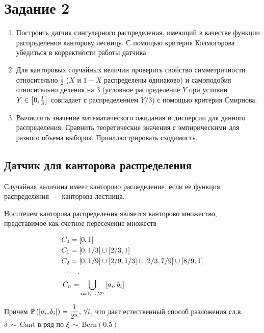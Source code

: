 \section{Задание 2}
    \begin{enumerate}
        \item Построить датчик сингулярного распределения, имеющий в качестве 
        функции распределения канторову лесницу. С помощью критерия Колмогорова 
        убедиться в корректности работы датчика.
        \item Для канторовых случайных величин проверить свойство симметричности 
        относительно $\frac{1}{2}$ ($X$ и $1 - X$ распределены одинаково) и 
        самоподобия относительно деления на 3 (условное распределение $Y$ при 
        условии $Y \in \left[0,\frac{1}{3}\right]$ совпадает с распределением 
        $Y/3$) с помощью критерия Смирнова.
        \item Вычислить значение математического ожидания и дисперсии для 
        данного распределения. Сравнить теоретические значения с эмпирическими 
        для разного объема выборок. Проиллюстрировать сходимость.
    \end{enumerate}

    \subsection{Датчик для канторова распределения}
        Случайная величина имеет канторово распеделение, если ее функция 
        распределения~--- канторова лестница.

        Носителем канторова распределения является канторово множество, 
        представимое как счетное пересечение множеств

        \begin{align*}
            C_0 = {} & [0,1] \\
            C_1 = {} & [0,1/3] \cup [2/3,1] \\
            C_2 = {} & [0,1/9] \cup [2/9,1/3] \cup [2/3,7/9] \cup [8/9,1] \\
            \cdots, & \\
            C_n = & \bigcup_{i = 1,\ldots, 2^n}{\left[a_i,b_i\right]}
        \end{align*}

        Причем $\mathbb{P}\left(\left[a_i,b_i\right]\right) = \dfrac{1}{2^n},\:\forall i$, что дает 
        естественный способ разложения сл.в. $\delta~\sim~\mathrm{Cant}$ в ряд 
        по  $\xi~\sim~\mathrm{Bern(0.5)}$

